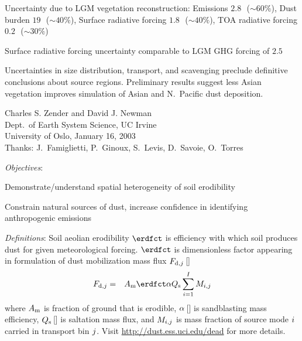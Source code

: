 \documentclass[final,dvips]{foils}
\begin{document}
\rotatefoilhead{\bgl
\Large\textcolor{blue}{\hfill Conclusions \hfill}}\vspace{-0.5in}\large
\begin{itemize*}
\item Uncertainty due to LGM vegetation reconstruction:
  Emissions $2.8$\,\Tgxyr\ ($\sim 60\%$), 
  Dust burden $19$\,\Tg\ ($\sim 40\%$), 
  Surface radiative forcing $1.8$\,\wxmS\ ($\sim 40\%$),
  TOA radiative forcing $0.2$\,\wxmS\ ($\sim 30\%$)
\item Surface radiative forcing uncertainty comparable to LGM GHG
  forcing of $2.5$\,\wxmS\ \cite[]{SLO03} 
\item Uncertainties in size distribution, transport, and scavenging 
  preclude definitive conclusions about source regions.
  Preliminary results suggest less Asian vegetation improves
  simulation of Asian and N.~Pacific dust deposition.
\end{itemize*}

\rotatefoilhead{\huge \textcolor{blue}{
Spatial Heterogeneity in Aeolian Erodibility: Uniform, Topographic, Geomorphic, and Hydrologic Hypotheses}}\vspace{-0.5in}\LARGE  
\begin{center}
Charles S. Zender and David J. Newman\\
Dept.\ of Earth System Science, UC Irvine\\
\bigskip
\bigskip
\bigskip
University of Oslo, January 16, 2003\\
\bigskip
{\large Thanks: J.~Famiglietti, P.~Ginoux, S.~Levis, D.~Savoie, O.~Torres}
\normalsize
\end{center}

\rotatefoilhead{\bgl
\Large\textcolor{blue}{\hfill Objectives \hfill}}\vspace{-0.5in}\large
\textit{Objectives}: 
\begin{itemize*}
\item Demonstrate/understand spatial heterogeneity of soil erodibility
\item Constrain natural sources of dust, increase confidence 
in identifying anthropogenic emissions 
\end{itemize*}

\rotatefoilhead{\bgl
\Large\textcolor{blue}{\hfill Definitions \hfill}}\vspace{-0.5in}\large
\textit{Definitions}:
Soil aeolian erodibility $\erdfct$ is efficiency with which soil
produces dust for given meteorological forcing.
$\erdfct$ is dimensionless factor appearing in formulation of dust
mobilization mass flux $F_{\mathrm{d},j}$\,[\kgxmSs] 
\begin{eqnarray}
\flxmssvrtdstj & = & 
\mblfrc \erdfct \hrzvrtprpfct \flxmsshrzslt 
\sum_{\binidx=1}^{\srcnbr} \mssovrsrcsnk 
\label{eqn:flx_mss_vrt_dst_ttl}
\end{eqnarray}
where $A_{\mathrm{m}}$ is fraction of ground that is erodible,
$\alpha$\,[\xm] is sandblasting mass efficiency,
$Q_{\mathrm{s}}$\,[\kgxms] is saltation mass flux, and
$M_{i,j}$ is mass fraction of source mode $i$
carried in transport bin $j$.
Visit \url{http://dust.ess.uci.edu/dead} for more details.
\end{document}
